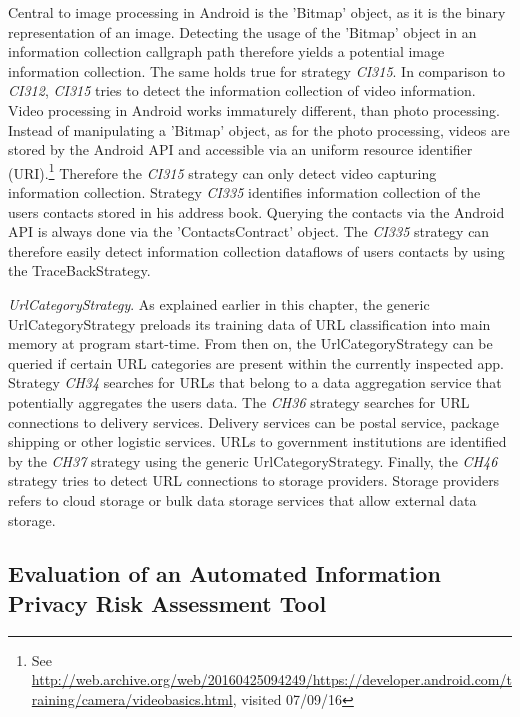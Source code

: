 Central to image processing in Android is the 'Bitmap' object, as it is the binary representation of an image.
Detecting the usage of the 'Bitmap' object in an information collection callgraph path therefore yields a potential image information collection.
The same holds true for strategy \textit{CI315}. 
In comparison to \textit{CI312}, \textit{CI315} tries to detect the information collection of video information.
Video processing in Android works immaturely different, than photo processing.
Instead of manipulating a 'Bitmap' object, as for the photo processing, videos are stored by the Android API and accessible via an uniform resource identifier (\acs{URI}).\footnote{\raggedright See \url{http://web.archive.org/web/20160425094249/https://developer.android.com/training/camera/videobasics.html}, visited 07/09/16}
Therefore the \textit{CI315} strategy can only detect video capturing information collection.
Strategy \textit{CI335} identifies information collection of the users contacts stored in his address book.
Querying the contacts via the Android API is always done via the 'ContactsContract' object.
The \textit{CI335} strategy can therefore easily detect information collection dataflows of users contacts by using the TraceBackStrategy.

\textit{UrlCategoryStrategy}.
As explained earlier in this chapter, the generic UrlCategoryStrategy preloads its training data of \acs{URL} classification into main memory at program start-time.
From then on, the UrlCategoryStrategy can be queried if certain URL categories are present within the currently inspected app. 
Strategy \textit{CH34} searches for URLs that belong to a data aggregation service that potentially aggregates the users data.
The \textit{CH36} strategy searches for URL connections to delivery services.
Delivery services can be postal service, package shipping or other logistic services.
URLs to government institutions are identified by the \textit{CH37} strategy using the generic UrlCategoryStrategy.
Finally, the \textit{CH46} strategy tries to detect URL connections to storage providers.
Storage providers refers to cloud storage or bulk data storage services that allow external data storage.

\subsection{Evaluation of an Automated Information Privacy Risk Assessment Tool}

